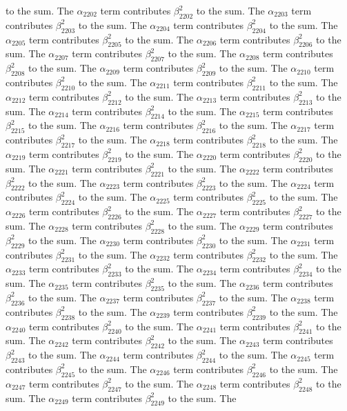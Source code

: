 \begin{lemma}
to the sum. The $\alpha_{2202}$ term contributes $\beta_{2202}^{2}$ to the sum. The $\alpha_{2203}$ term contributes $\beta_{2203}^{2}$ to the sum. The $\alpha_{2204}$ term contributes $\beta_{2204}^{2}$ to the sum. The $\alpha_{2205}$ term contributes $\beta_{2205}^{2}$ to the sum. The $\alpha_{2206}$ term contributes $\beta_{2206}^{2}$ to the sum. The $\alpha_{2207}$ term contributes $\beta_{2207}^{2}$ to the sum. The $\alpha_{2208}$ term contributes $\beta_{2208}^{2}$ to the sum. The $\alpha_{2209}$ term contributes $\beta_{2209}^{2}$ to the sum. The $\alpha_{2210}$ term contributes $\beta_{2210}^{2}$ to the sum. The $\alpha_{2211}$ term contributes $\beta_{2211}^{2}$ to the sum. The $\alpha_{2212}$ term contributes $\beta_{2212}^{2}$ to the sum. The $\alpha_{2213}$ term contributes $\beta_{2213}^{2}$ to the sum. The $\alpha_{2214}$ term contributes $\beta_{2214}^{2}$ to the sum. The $\alpha_{2215}$ term contributes $\beta_{2215}^{2}$ to the sum. The $\alpha_{2216}$ term contributes $\beta_{2216}^{2}$ to the sum. The $\alpha_{2217}$ term contributes $\beta_{2217}^{2}$ to the sum. The $\alpha_{2218}$ term contributes $\beta_{2218}^{2}$ to the sum. The $\alpha_{2219}$ term contributes $\beta_{2219}^{2}$ to the sum. The $\alpha_{2220}$ term contributes $\beta_{2220}^{2}$ to the sum. The $\alpha_{2221}$ term contributes $\beta_{2221}^{2}$ to the sum. The $\alpha_{2222}$ term contributes $\beta_{2222}^{2}$ to the sum. The $\alpha_{2223}$ term contributes $\beta_{2223}^{2}$ to the sum. The $\alpha_{2224}$ term contributes $\beta_{2224}^{2}$ to the sum. The $\alpha_{2225}$ term contributes $\beta_{2225}^{2}$ to the sum. The $\alpha_{2226}$ term contributes $\beta_{2226}^{2}$ to the sum. The $\alpha_{2227}$ term contributes $\beta_{2227}^{2}$ to the sum. The $\alpha_{2228}$ term contributes $\beta_{2228}^{2}$ to the sum. The $\alpha_{2229}$ term contributes $\beta_{2229}^{2}$ to the sum. The $\alpha_{2230}$ term contributes $\beta_{2230}^{2}$ to the sum. The $\alpha_{2231}$ term contributes $\beta_{2231}^{2}$ to the sum. The $\alpha_{2232}$ term contributes $\beta_{2232}^{2}$ to the sum. The $\alpha_{2233}$ term contributes $\beta_{2233}^{2}$ to the sum. The $\alpha_{2234}$ term contributes $\beta_{2234}^{2}$ to the sum. The $\alpha_{2235}$ term contributes $\beta_{2235}^{2}$ to the sum. The $\alpha_{2236}$ term contributes $\beta_{2236}^{2}$ to the sum. The $\alpha_{2237}$ term contributes $\beta_{2237}^{2}$ to the sum. The $\alpha_{2238}$ term contributes $\beta_{2238}^{2}$ to the sum. The $\alpha_{2239}$ term contributes $\beta_{2239}^{2}$ to the sum. The $\alpha_{2240}$ term contributes $\beta_{2240}^{2}$ to the sum. The $\alpha_{2241}$ term contributes $\beta_{2241}^{2}$ to the sum. The $\alpha_{2242}$ term contributes $\beta_{2242}^{2}$ to the sum. The $\alpha_{2243}$ term contributes $\beta_{2243}^{2}$ to the sum. The $\alpha_{2244}$ term contributes $\beta_{2244}^{2}$ to the sum. The $\alpha_{2245}$ term contributes $\beta_{2245}^{2}$ to the sum. The $\alpha_{2246}$ term contributes $\beta_{2246}^{2}$ to the sum. The $\alpha_{2247}$ term contributes $\beta_{2247}^{2}$ to the sum. The $\alpha_{2248}$ term contributes $\beta_{2248}^{2}$ to the sum. The $\alpha_{2249}$ term contributes $\beta_{2249}^{2}$ to the sum. The 
\end{lemma}
